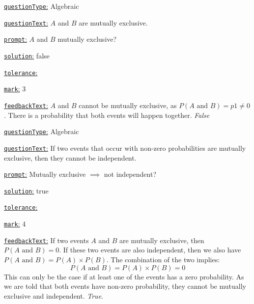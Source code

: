 \documentclass[preview]{standalone}
\newcommand \fieldname[1]{\underline{\texttt{#1}:}}
\begin{document}
\fieldname{questionType}
Algebraic

\fieldname{questionText}
$A$ and $B$ are mutually exclusive.

\fieldname{prompt}
$A$ and $B$ mutually exclusive?

\fieldname{solution}
false

\fieldname{tolerance}


\fieldname{mark}
3

\fieldname{feedbackText}
$A$ and $B$ cannot be mutually exclusive, as $P(A \textrm{ and } B) = {p1} \ne 0$. There is a probability that both events will happen together. \emph{False}

\fieldname{questionType}
Algebraic

\fieldname{questionText}
If two events that occur with non-zero probabilities are mutually exclusive, then they cannot be independent.

\fieldname{prompt}
Mutually exclusive $\implies$ not independent?

\fieldname{solution}
true

\fieldname{tolerance}


\fieldname{mark}
4

\fieldname{feedbackText}
If two events $A$ and $B$ are mutually exclusive, then $P(A \textrm{ and } B) = 0$. If these two events are also independent, then  we also have $P(A \textrm{ and } B) = P(A)\times P(B)$. The combination of the two implies:
\[
P(A \textrm{ and } B) = P(A)\times P(B) = 0
\]
This can only be the case if at least one of the events has a zero probability. As we are told that both events have non-zero probability, they cannot be mutually exclusive and independent. \emph{True}.

\end{document}
